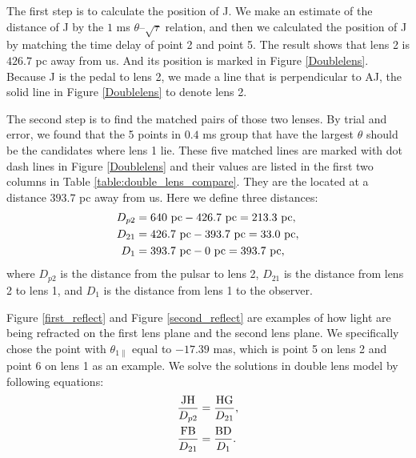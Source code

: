 \documentclass[useAMS,usenatbib]{mn2e}
\begin{document}

The first step is to calculate the position of J. We make an estimate of the distance of J by the $1$ ms $\theta$--$\sqrt{\tau}$ relation, and then we calculated the position of J by matching the time delay of point 2 and point 5. The result shows that lens 2 is $426.7$ pc away from us. And its position is marked in Figure \ref{Doublelens}. Because J is the pedal to lens 2, we made a line that is perpendicular to AJ, the solid line in Figure \ref{Doublelens} to denote lens 2.

The second step is to find the matched pairs of those two lenses. By trial and error, we found that the 5 points in $0.4$ ms group that have the largest $\theta$ should be the candidates where lens 1 lie.  These five matched lines are marked with dot dash lines in Figure \ref{Doublelens} and their values are listed in the first two columns in Table \ref{table:double_lens_compare}. They are the located at a distance $393.7$ pc away from us. Here we define three distances:
\begin{equation}
\begin{aligned}
D_{p2}&=640~{\rm pc}-426.7~{\rm pc} =213.3~{\rm pc},\\
D_{21}&=426.7~{\rm pc}-393.7~{\rm pc} =33.0~{\rm pc},\\
D_{1}&=393.7~{\rm pc}- 0~{\rm pc} = 393.7~{\rm pc}, 
\end{aligned} 
\end{equation}
where $D_{p2}$ is the distance from the pulsar to lens 2, $D_{21}$ is the distance from lens 2 to lens 1, and $D_{1}$ is the distance from lens 1 to the observer.

Figure \ref{first_reflect} and Figure \ref{second_reflect} are examples of how light are being refracted on the first lens plane and the second lens plane. We specifically chose the point with $\theta_{1\parallel}$ equal to $-17.39$ mas, which is point 5 on lens 2 and point 6 on lens 1 as an example. We solve the solutions in double lens model by following equations:
\begin{equation}
\begin{aligned}
\frac{\rm JH}{D_{p2}}&=\frac{\rm HG}{D_{21}},\\
\frac{\rm FB}{D_{21}}&=\frac{\rm BD}{D_{1}}.
\end{aligned}
\end{equation}
\end{document}
